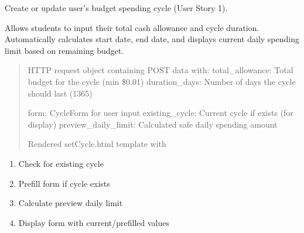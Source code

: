 \documentclass[letterpaper,10pt,english]{sphinxmanual}
\begin{document}

\begin{fulllineitems}
\label{\detokenize{expensesApp:expensesApp.views.setCycle}}
\pysigstartsignatures
\pysiglinewithargsret
{}
{}
{}
\pysigstopsignatures
\sphinxAtStartPar
Create or update user’s budget spending cycle (User Story 1).

\sphinxAtStartPar
Allows students to input their total cash allowance and cycle duration.
Automatically calculates start date, end date, and displays current daily
spending limit based on remaining budget.
\begin{quote}\begin{description}
\sphinxAtStartPar
{} \textendash{} HTTP request object containing POST data with:
total\_allowance: Total budget for the cycle (min \$0.01)
duration\_days: Number of days the cycle should last (1\sphinxhyphen{}365)

\sphinxAtStartPar
form: CycleForm for user input
existing\_cycle: Current cycle if exists (for display)
preview\_daily\_limit: Calculated safe daily spending amount

\sphinxAtStartPar
Rendered setCycle.html template with

\end{description}\end{quote}
\begin{description}
\begin{description}
\begin{enumerate}
%
\item {} 
\sphinxAtStartPar
Check for existing cycle

\item {} 
\sphinxAtStartPar
Pre\sphinxhyphen{}fill form if cycle exists

\item {} 
\sphinxAtStartPar
Calculate preview daily limit

\item {} 
\sphinxAtStartPar
Display form with current/pre\sphinxhyphen{}filled values

\end{enumerate}


\end{description}
\end{description}
\end{fulllineitems}
\end{document}
